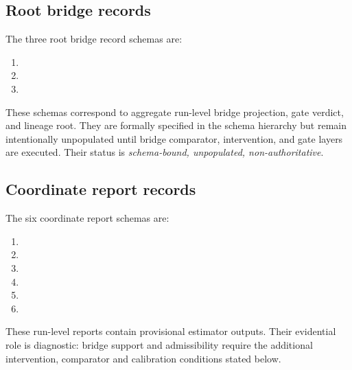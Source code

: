 \documentclass[11pt,a4paper]{article}
\theoremstyle{definition}
\begin{document}
\subsection{Root bridge records}
The three root bridge record schemas are:
\begin{enumerate}[leftmargin=1.5em]
\item \texttt{\allowbreak{}\allowbreak{}\allowbreak{}\allowbreak{}}
\item \texttt{\allowbreak{}\allowbreak{}\allowbreak{}\allowbreak{}}
\item \texttt{\allowbreak{}\allowbreak{}\allowbreak{}}
\end{enumerate}
These schemas correspond to aggregate run-level bridge projection, gate verdict, and lineage root. They are formally specified in the schema hierarchy but remain intentionally unpopulated until bridge comparator, intervention, and gate layers are executed. Their status is \emph{schema-bound, unpopulated, non-authoritative}.

\subsection{Coordinate report records}
The six coordinate report schemas are:
\begin{enumerate}[leftmargin=1.5em]
\item \texttt{\allowbreak{}\allowbreak{}\allowbreak{}\allowbreak{}}
\item \texttt{\allowbreak{}\allowbreak{}\allowbreak{}}
\item \texttt{\allowbreak{}\allowbreak{}}
\item \texttt{\allowbreak{}\allowbreak{}\allowbreak{}}
\item \texttt{\allowbreak{}\allowbreak{}}
\item \texttt{\allowbreak{}\allowbreak{}\allowbreak{}\allowbreak{}}
\end{enumerate}
These run-level reports contain provisional estimator outputs. Their evidential role is diagnostic: bridge support and admissibility require the additional intervention, comparator and calibration conditions stated below.
\end{document}
